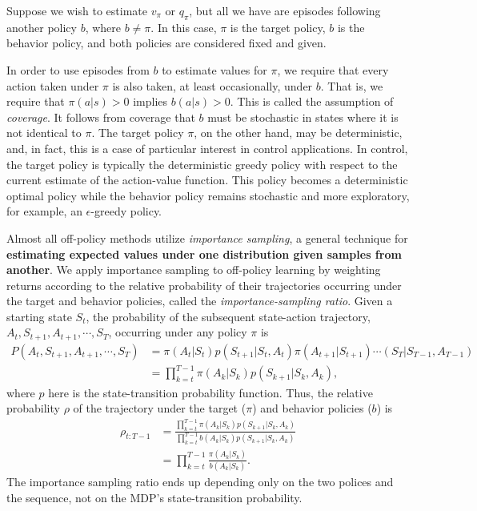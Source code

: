 Suppose we wish to estimate $v_\pi$ or $q_\pi$, but all we have are episodes following another policy $b$, where $b\neq \pi$. In this case, $\pi$ is the target policy, $b$ is the behavior policy, and both policies are considered fixed and given. 

In order to use episodes from $b$ to estimate values for $\pi$, we require that every action taken under $\pi$ is also taken, at least occasionally, under $b$. That is, we require that $\pi(a|s) > 0$ implies $b(a|s) > 0$. This is called the assumption of \textit{coverage}. It follows from coverage that $b$ must be stochastic in states where it is not identical to $\pi$. The target policy $\pi$, on the other hand, may be deterministic, and, in fact, this is a case of particular interest in control applications. In control, the target policy is typically the deterministic greedy policy with respect to the current estimate of the action-value function. This policy becomes a deterministic optimal policy while the behavior policy remains stochastic and more exploratory, for example, an $\epsilon$-greedy policy. %

Almost all off-policy methods utilize \textit{importance sampling}, a general technique for \textbf{estimating expected values under one distribution given samples from another}. We apply importance sampling to off-policy learning by weighting returns according to the relative probability of their trajectories occurring under the target and behavior policies, called the \textit{importance-sampling ratio}. Given a starting state $S_t$, the probability of the subsequent state-action trajectory, $A_t, S_{t+1}, A_{t+1},\cdots,S_T$, occurring under any policy $\pi$ is 
\begin{align*}
	P(A_t, S_{t+1}, A_{t+1},\cdots,S_T)&= \pi(A_t|S_t)p(S_{t+1}|S_t,A_t)\pi(A_{t+1}|S_{t+1})\cdots(S_T|S_{T-1},A_{T-1})\\ 
	&= \prod_{k=t}^{T-1}\pi(A_k|S_k)p(S_{k+1}|S_k,A_k),
\end{align*}
where $p$ here is the state-transition probability function. Thus, the relative probability $\rho$ of the trajectory under the target ($\pi$) and behavior policies ($b$) is 
\begin{align*}
	\rho_{t:T-1} &=  \frac{\prod_{k=t}^{T-1}\pi(A_k|S_k)p(S_{k+1}|S_k,A_k)}{ \prod_{k=t}^{T-1}b(A_k|S_k)p(S_{k+1}|S_k,A_k)}\\
	&= \prod_{k=t}^{T-1}\frac{\pi(A_k|S_k)}{b(A_k|S_k)}.
\end{align*}
The importance sampling ratio ends up depending only on the two polices and the sequence, not on the MDP's state-transition probability.

